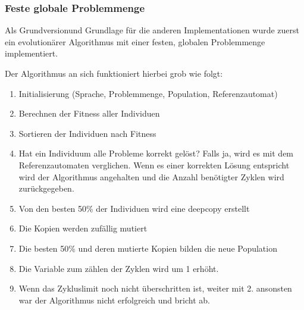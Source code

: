 \subsubsection{Feste globale Problemmenge}
Als \flqq Grundversion\frqq und Grundlage für die anderen Implementationen wurde zuerst ein evolutionärer Algorithmus mit einer festen, globalen Problemmenge implementiert.

Der Algorithmus an sich funktioniert hierbei grob wie folgt: 
\begin{enumerate}
\item Initialisierung (Sprache, Problemmenge, Population, Referenzautomat)
\item Berechnen der Fitness aller Individuen
\item Sortieren der Individuen nach Fitness
\item Hat ein Individuum alle Probleme korrekt gelöst? Falls ja, wird es mit dem Referenzautomaten verglichen. Wenn es einer korrekten Lösung entspricht wird der Algorithmus angehalten und die Anzahl benötigter Zyklen wird zurückgegeben.
\item Von den besten 50\% der Individuen wird eine \Gls{deepcopy} erstellt
\item Die Kopien werden zufällig mutiert
\item Die besten 50\% und deren mutierte Kopien bilden die neue Population
\item Die Variable zum zählen der Zyklen wird um 1 erhöht.
\item Wenn das Zykluslimit noch nicht überschritten ist, weiter mit 2. ansonsten war der Algorithmus nicht erfolgreich und bricht ab.
\end{enumerate}